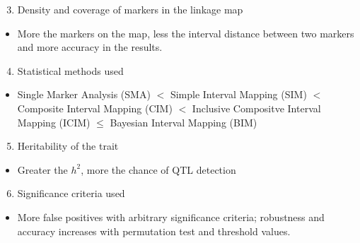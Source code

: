 \documentclass[
  ignorenonframetext,
  aspectratio=169]{beamer}
\providecommand{\tightlist}{%
  \setlength{\itemsep}{0pt}\setlength{\parskip}{0pt}}
\begin{document}
\begin{frame}{}
\protect\hypertarget{section-2}{}
\begin{enumerate}
\setcounter{enumi}{2}
\tightlist
\item
  Density and coverage of markers in the linkage map
\end{enumerate}

\begin{itemize}
\tightlist
\item
  More the markers on the map, less the interval distance between two
  markers and more accuracy in the results.
\end{itemize}

\begin{enumerate}
\setcounter{enumi}{3}
\tightlist
\item
  Statistical methods used
\end{enumerate}

\begin{itemize}
\tightlist
\item
  Single Marker Analysis (SMA) \(<\) Simple Interval Mapping (SIM) \(<\)
  Composite Interval Mapping (CIM) \(<\) Inclusive Compositve Interval
  Mapping (ICIM) \(\leq\) Bayesian Interval Mapping (BIM)
\end{itemize}
\end{frame}

\begin{frame}{}
\protect\hypertarget{section-3}{}
\begin{enumerate}
\setcounter{enumi}{4}
\tightlist
\item
  Heritability of the trait
\end{enumerate}

\begin{itemize}
\tightlist
\item
  Greater the \(h^2\), more the chance of QTL detection
\end{itemize}

\begin{enumerate}
\setcounter{enumi}{5}
\tightlist
\item
  Significance criteria used
\end{enumerate}

\begin{itemize}
\tightlist
\item
  More false positives with arbitrary significance criteria; robustness
  and accuracy increases with permutation test and threshold values.
\end{itemize}
\end{frame}
\end{document}
